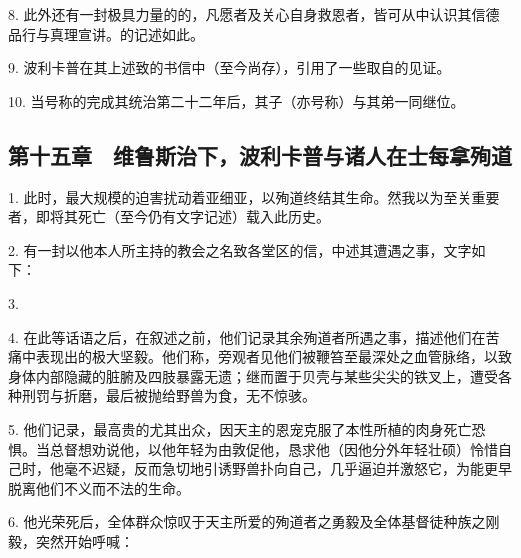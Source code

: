 8. 此外还有一封极具力量的的，凡愿者及关心自身救恩者，皆可从中认识其信德品行与真理宣讲。的记述如此。\par

9. 波利卡普在其上述致的书信中（至今尚存），引用了一些取自的见证。\par

10. 当号称的完成其统治第二十二年后，其子（亦号称）与其弟一同继位。\par


\subsection{第十五章　维鲁斯治下，波利卡普与诸人在士每拿殉道}

1. 此时，最大规模的迫害扰动着亚细亚，以殉道终结其生命。然我以为至关重要者，即将其死亡（至今仍有文字记述）载入此历史。\par

2. 有一封以他本人所主持的教会之名致各堂区的信，中述其遭遇之事，文字如下：\par

3. \par

4. 在此等话语之后，在叙述之前，他们记录其余殉道者所遇之事，描述他们在苦痛中表现出的极大坚毅。他们称，旁观者见他们被鞭笞至最深处之血管脉络，以致身体内部隐藏的脏腑及四肢暴露无遗；继而置于贝壳与某些尖尖的铁叉上，遭受各种刑罚与折磨，最后被抛给野兽为食，无不惊骇。\par

5. 他们记录，最高贵的尤其出众，因天主的恩宠克服了本性所植的肉身死亡恐惧。当总督想劝说他，以他年轻为由敦促他，恳求他（因他分外年轻壮硕）怜惜自己时，他毫不迟疑，反而急切地引诱野兽扑向自己，几乎逼迫并激怒它，为能更早脱离他们不义而不法的生命。\par

6. 他光荣死后，全体群众惊叹于天主所爱的殉道者之勇毅及全体基督徒种族之刚毅，突然开始呼喊：\par

